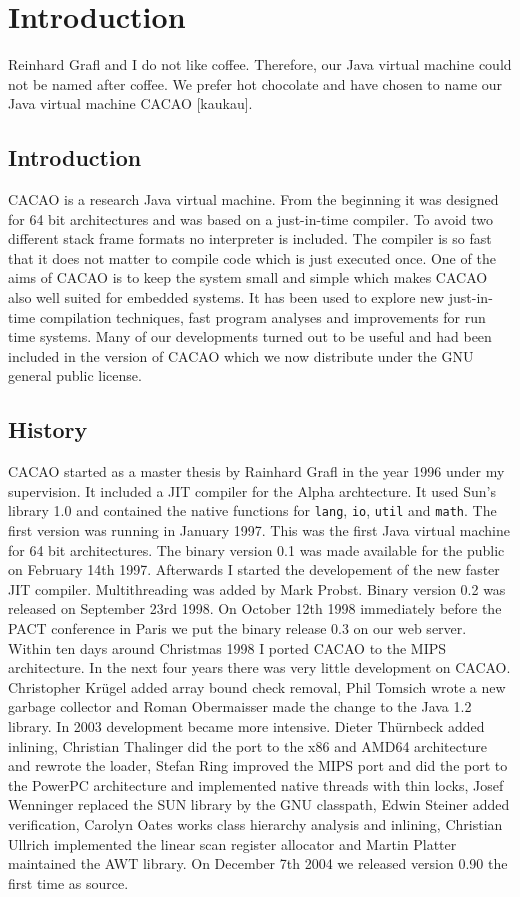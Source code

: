 \chapter{Introduction}

Reinhard Grafl and I do not like coffee. Therefore, our Java virtual machine
could not be named after coffee. We prefer hot chocolate and have chosen to
name our Java virtual machine CACAO [kaukau].

\section{Introduction}

CACAO is a research Java virtual machine. From the beginning it was designed
for 64 bit architectures and was based on a just-in-time compiler. To avoid
two different stack frame formats no interpreter is included. The compiler is
so fast that it does not matter to compile code which is just executed once.
One of the aims of CACAO is to keep the system small and simple which makes
CACAO also well suited for embedded systems. It has been used to explore new
just-in-time compilation techniques, fast program analyses and improvements
for run time systems. Many of our developments turned out to be useful and
had been included in the version of CACAO which we now distribute under the
GNU general public license.

\section{History}

CACAO started as a master thesis by Rainhard Grafl in the year 1996 under
my supervision. It included a JIT compiler
for the Alpha archtecture. It used Sun's library 1.0
and contained the native functions for {\tt lang}, {\tt io}, {\tt util} and
{\tt math}. The first version was running in January 1997. This was the first
Java virtual machine for 64 bit architectures. The binary version 0.1 was made
available for the public on February 14th 1997. Afterwards I started the
developement of the new faster JIT compiler. Multithreading was added by
Mark Probst. Binary version 0.2 was released on September 23rd 1998. On
October 12th 1998 immediately before the PACT conference in Paris we put the
binary release 0.3 on our web server. Within ten days around Christmas 1998
I ported CACAO to the MIPS architecture. In the next four years there was
very little development on CACAO. Christopher Kr\"ugel added array bound check
removal, Phil Tomsich wrote a new garbage collector and Roman Obermaisser
made the change to the Java 1.2 library. In 2003 development became more
intensive. Dieter Th\"urnbeck added inlining, Christian Thalinger did the
port to the x86 and AMD64 architecture and rewrote the loader, Stefan Ring
improved the MIPS port and did the port to the PowerPC architecture and
implemented native threads with thin locks, Josef Wenninger replaced the
SUN library by the GNU classpath, Edwin Steiner added verification,
Carolyn Oates works class hierarchy analysis and inlining, Christian
Ullrich implemented the linear scan register allocator and Martin Platter
maintained the AWT library. On December 7th 2004 we released version 0.90
the first time as source.


